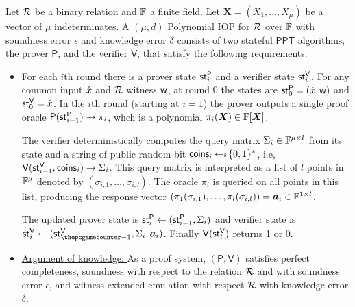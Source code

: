\documentclass[runningheads]{llncs}
\def\bitset{\{0,1\}}
\def\ppt{\mathsf{PPT}}
\def\prover{\mathsf{P}}
\def\verifier{\mathsf{V}}
\def\coins{\mathsf{coins}}
\begin{document}
\begin{definition}\label{defn:polyIOP}
	Let $\mathcal{R}$ be a binary relation and $\mathbb{F}$ a finite field. Let $\bm{X}=(X_1,\ldots, X_{\mu})$ be a vector of $\mu$ indeterminates. A $(\mu, d)$ Polynomial IOP for $\mathcal{R}$ over $\mathbb{F}$ with soundness error $\epsilon$ and knowledge error $\delta$ consists of two stateful $\ppt$ algorithms, the prover $\prover$, and the verifier $\verifier$, that satisfy the following requirements: 
	\begin{itemize}
		\item For each $i$th round there is a prover state $\st^{\prover}_{i}$ and a verifier state $\st^{\verifier}_i$. For any common input $\hat{x}$ and $\mathcal{R}$ witness $\mathsf{w}$, at round 0 the states are $\st^{\prover}_0 = (\stmt, \wit)$ and $\st^{\verifier}_0 = \stmt$. In the $i$th round (starting at $i=1$) the prover outputs a single proof oracle $\prover(\st^{\prover}_{i-1})\rightarrow \pi_i$, whch is a polynomial $\pi_i(\bm{X})\in \mathbb{F}[\bm{X}]$.
		
		The verifier deterministically computes the query matrix $\Sigma_i\in \mathbb{F}^{\mu \times l}$ from its state and a string of public random bit $\coins_i \sample \bitset^*$, i.e, $\verifier(\st^{\verifier}_{i-1}, \coins_i) \rightarrow \Sigma_i$. This query matrix is interpreted as a list of $l$ points in $\mathbb{F}^{\mu}$ denoted by $(\sigma_{i,1},\ldots, \sigma_{i,l})$. The oracle $\pi_i$ is queried on all points in this list, producing the response vector $(\pi_1 (\sigma_{i,1}) , \ldots, \pi_l (\sigma_{i,l})) = \bm{a}_i \in \mathbb{F}^{1\times l}$.
		
		The updated prover state is $\st^{\prover}_i \leftarrow (\st^{\prover}_{i-1}, \Sigma_i)$ and verifier state is $\st^{\verifier}_{i} \leftarrow (\st^{\verifier}_{\i-1}, \Sigma_i, \bm{a}_i)$. Finally $\verifier(\st^{\verifier}_t)$ returns 1 or 0.   
		\item \underline{Argument of knowledge: } As a proof system, $(\prover, \verifier)$ satisfies perfect completeness, soundness with respect to the relation $\mathcal{R}$ and with soundness error $\epsilon$, and witness-extended emulation with respect $\mathcal{R}$ with knowledge error $\delta$.
	\end{itemize}
\end{definition}
\end{document}
